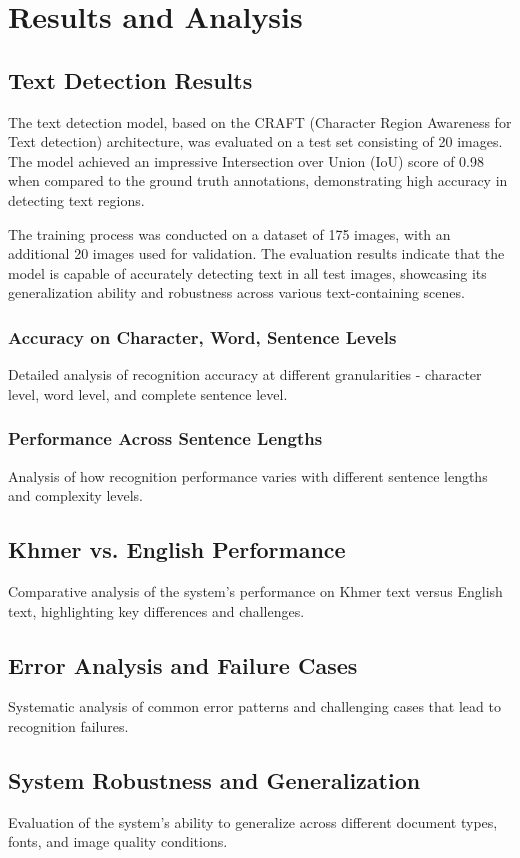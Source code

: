 \chapter{Results and Analysis}
\label{ch:results}

\section{Text Detection Results}
\label{sec:detection-results}

The text detection model, based on the CRAFT (Character Region Awareness for Text detection) 
architecture, was evaluated on a test set consisting of 20 images. The model achieved an impressive 
Intersection over Union (IoU) score of 0.98 when compared to the ground truth annotations, 
demonstrating high accuracy in detecting text regions.

The training process was conducted on a dataset of 175 images, with an additional 20 images 
used for validation. The evaluation results indicate that the model is capable of accurately 
detecting text in all test images, showcasing its generalization ability and robustness across 
various text-containing scenes.

\subsection{Accuracy on Character, Word, Sentence Levels}
\label{subsec:accuracy}
Detailed analysis of recognition accuracy at different granularities - character level, word level, and complete sentence level.

\subsection{Performance Across Sentence Lengths}
\label{subsec:performance}
Analysis of how recognition performance varies with different sentence lengths and complexity levels.

\section{Khmer vs. English Performance}
\label{sec:comparison-results}
Comparative analysis of the system's performance on Khmer text versus English text, highlighting key differences and challenges.

\section{Error Analysis and Failure Cases}
\label{sec:error-analysis}
Systematic analysis of common error patterns and challenging cases that lead to recognition failures.

\section{System Robustness and Generalization}
\label{sec:robustness}
Evaluation of the system's ability to generalize across different document types, fonts, and image quality conditions.
